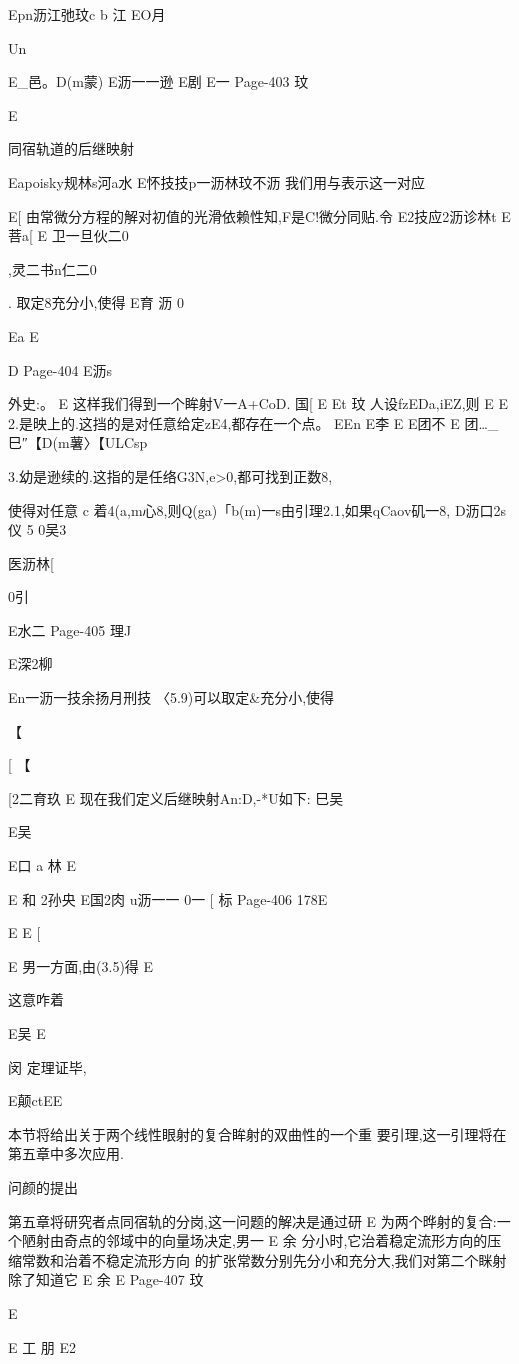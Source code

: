 {{{{{{{{{{{Epn沥江弛玟c
b
江
EO月

Un

E_邑。D(m蒙)
E沥一一逊
E剧
E一
Page-403
玟

E

同宿轨道的后继映射

Eapoisky规林s河a水
E怀技技p一沥林玟不沥
我们用与表示这一对应

E[
由常微分方程的解对初值的光滑依赖性知,F是C!微分同贴.令
E2技应2沥诊林t
E
菩a[
E
卫一旦伙二0},灵二书n仁二0}.
取定8充分小,使得
E育
沥
0

Ea
E

D
Page-404
E沥s

外史:。
E
这样我们得到一个眸射V一A+CoD.
国[
E
Et
玟
人设fzEDa,iEZ,则
E
E
2.是映上的.这挡的是对任意给定zE4,都存在一个点。
EEn
E李
E
E团不
E
团…_巳″【D(m薯〉【ULCsp

3.幼是逊续的.这指的是任络G3N,e>0,都可找到正数8,

使得对任意
c
着4(a,m心8,则Q(ga)「b(m)一s由引理2.1,如果qCaov矶一8,
D沥口2s仪
5
0吴3

医沥林[

0引

E水二
Page-405
理J

E深2柳

En一沥一技余扬月刑技
〈5.9)可以取定&充分小,使得

【

[
【

[2二育玖
E
现在我们定义后继映射An:D,-*U如下:
巳吴

E吴

E口
a
林
E

E
和
2孙央
E国2肉
u沥一一
0一
[
标
Page-406
178E

E
E
[

E
男一方面,由(3.5)得
E

这意咋着

E吴
E

闵
定理证毕,

E颠ctEE

本节将给出关于两个线性眼射的复合眸射的双曲性的一个重
要引理,这一引理将在第五章中多次应用.

问颜的提出

第五章将研究者点同宿轨的分岗,这一问题的解决是通过研
E
为两个晔射的复合:一个陋射由奇点的邻域中的向量场决定,男一
E
余
分小时,它治着稳定流形方向的压缩常数和治着不稳定流形方向
的扩张常数分别先分小和充分大,我们对第二个眯射除了知道它
E
余
E
Page-407
玟

E

E
工
朋
E2

}}}}}}}}}
